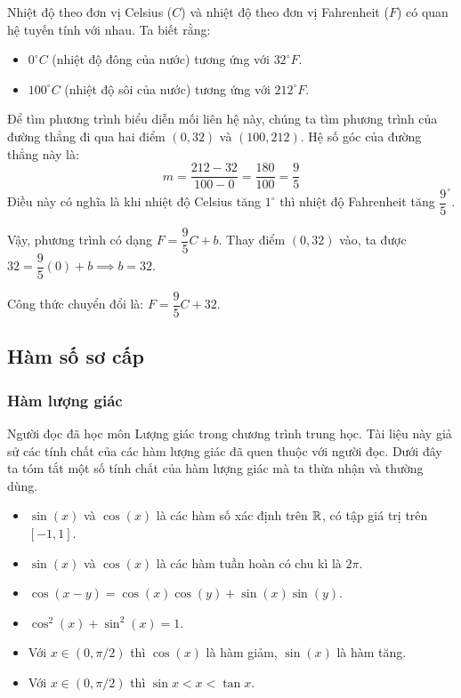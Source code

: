 \begin{example}
    Nhiệt độ theo đơn vị Celsius ($C$) và nhiệt độ theo đơn vị Fahrenheit ($F$) có quan hệ tuyến tính với nhau. Ta biết rằng:
    \begin{itemize}
        \item $0^{\circ}C$ (nhiệt độ đông của nước) tương ứng với $32^{\circ}F$.
        \item $100^{\circ}C$ (nhiệt độ sôi của nước) tương ứng với $212^{\circ}F$.
    \end{itemize}
    Để tìm phương trình biểu diễn mối liên hệ này, chúng ta tìm phương trình của đường thẳng đi qua hai điểm $(0, 32)$ và $(100, 212)$. Hệ số góc của đường thẳng này là:
    \[
    m = \dfrac{212 - 32}{100 - 0} = \dfrac{180}{100} = \dfrac{9}{5}
    \]
    Điều này có nghĩa là khi nhiệt độ Celsius tăng $1^{\circ}$ thì nhiệt độ Fahrenheit tăng $\dfrac{9}{5}^{\circ}$.
    
    Vậy, phương trình có dạng $F = \dfrac{9}{5}C + b$. Thay điểm $(0, 32)$ vào, ta được $32 = \dfrac{9}{5}(0) + b \implies b = 32$.
    
    Công thức chuyển đổi là: $F = \dfrac{9}{5}C + 32$.
\end{example}

\subsection{Hàm số sơ cấp}
\label{subsec:elementary-function}

\subsubsection{Hàm lượng giác}
Người đọc đã học môn Lượng giác trong chương trình trung học. Tài liệu này giả sử các tính chất của các hàm lượng giác đã quen thuộc với người đọc. Dưới đây ta tóm tắt một số tính chất của hàm lượng giác mà ta thừa nhận và thường dùng.
\begin{itemize}
    \item $\sin(x)$ và $\cos(x)$ là các hàm số xác định trên $\mathbb{R}$, có tập giá trị trên $[-1, 1]$.
    \item $\sin(x)$ và $\cos(x)$ là các hàm tuần hoàn có chu kì là $2\pi$.
    \item $\cos(x-y) = \cos(x)\cos(y) + \sin(x)\sin(y)$.
    \item $\cos^2(x) + \sin^2(x) = 1$.
    \item Với $x \in (0, \pi/2)$ thì $\cos(x)$ là hàm giảm, $\sin(x)$ là hàm tăng.
    \item Với $x \in (0, \pi/2)$ thì $\sin x < x < \tan x$.
\end{itemize}

